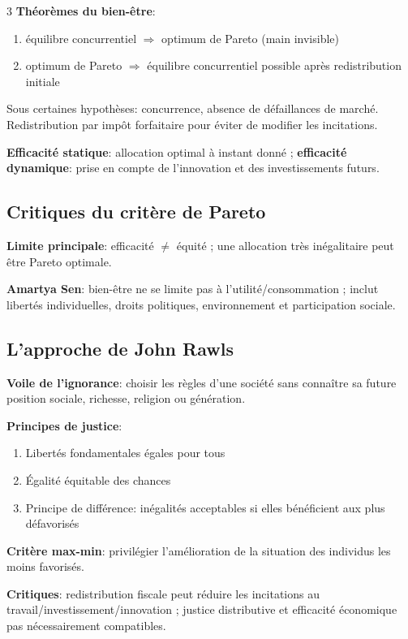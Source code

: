 \documentclass[12pt, a4paper]{article}
\begin{document}
\begin{multicols*}{3}
\textbf{Théorèmes du bien-être}:
\begin{enumerate}[\arabic*.]
  \item équilibre concurrentiel $\Rightarrow$ optimum de Pareto (main invisible)
  \item optimum de Pareto $\Rightarrow$ équilibre concurrentiel possible après redistribution initiale
\end{enumerate}
Sous certaines hypothèses: concurrence, absence de défaillances de marché. Redistribution par impôt forfaitaire pour éviter de modifier les incitations.

\textbf{Efficacité statique}: allocation optimal à instant donné ; \textbf{efficacité dynamique}: prise en compte de l'innovation et des investissements futurs.
\vspace{-1em}
\colbreak
\subsection{Critiques du critère de Pareto}

\textbf{Limite principale}: efficacité $\neq$ équité ; une allocation très inégalitaire peut être Pareto optimale.

\textbf{Amartya Sen}: bien-être ne se limite pas à l'utilité/consommation ; inclut libertés individuelles, droits politiques, environnement et participation sociale.

\subsection{L'approche de John Rawls}

\textbf{Voile de l'ignorance}: choisir les règles d'une société sans connaître sa future position sociale, richesse, religion ou génération.

\textbf{Principes de justice}:
\begin{enumerate}[\roman*.]
  \item Libertés fondamentales égales pour tous
  \item Égalité équitable des chances
  \item Principe de différence: inégalités acceptables si elles bénéficient aux plus défavorisés
\end{enumerate}

\textbf{Critère max-min}: privilégier l'amélioration de la situation des individus les moins favorisés.

\textbf{Critiques}: redistribution fiscale peut réduire les incitations au travail/investissement/innovation ; justice distributive et efficacité économique pas nécessairement compatibles.


\end{multicols*}
\end{document}
